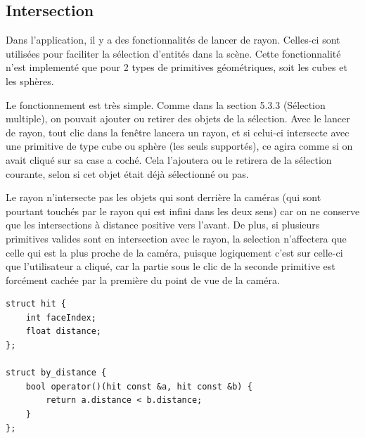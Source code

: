 \subsection{Intersection}
Dans l'application, il y a des fonctionnalités de lancer de rayon. Celles-ci sont utilisées pour faciliter la sélection d'entités dans la scène. Cette fonctionnalité n'est implementé que pour 2 types de primitives géométriques, soit les cubes et les sphères.

Le fonctionnement est très simple. Comme dans la section 5.3.3 (Sélection multiple), on pouvait ajouter ou retirer des objets de la sélection. Avec le lancer de rayon, tout clic dans la fenêtre lancera un rayon, et si celui-ci intersecte avec une primitive de type cube ou sphère (les seuls supportés), ce agira comme si on avait cliqué sur sa case a coché. Cela l'ajoutera ou le retirera de la sélection courante, selon si cet objet était déjà sélectionné ou pas.

Le rayon n'intersecte pas les objets qui sont derrière la caméras (qui sont pourtant touchés par le rayon qui est infini dans les deux sens) car on ne conserve que les intersections à distance positive vers l'avant. De plus, si plusieurs primitives valides sont en intersection avec le rayon, la selection n'affectera que celle qui est la plus proche de la caméra, puisque logiquement c'est sur celle-ci que l'utilisateur a cliqué, car la partie sous le clic de la seconde primitive est forcément cachée par la première du point de vue de la caméra.

\begin{lstlisting}
struct hit {
	int faceIndex;
	float distance;
};

struct by_distance {
	bool operator()(hit const &a, hit const &b) {
		return a.distance < b.distance;
	}
};
\end{lstlisting}


